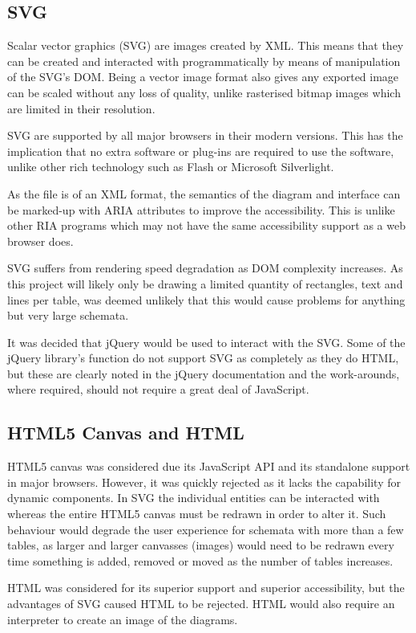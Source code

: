 \subsection{SVG}
Scalar vector graphics (SVG) are images created by XML. This means that they can be created and interacted with programmatically by means of manipulation of the SVG's DOM. Being a vector image format also gives any exported image can be scaled without any loss of quality, unlike rasterised bitmap images which are limited in their resolution.

SVG are supported by all major browsers in their modern versions. This has the implication that no extra software or plug-ins are required to use the software, unlike other rich technology such as Flash or Micro\-soft Silver\-light.

As the file is of an XML format, the semantics of the diagram and interface can be marked-up with ARIA attributes to improve the accessibility. This is unlike other RIA programs which may not have the same accessibility support as a web browser does.

SVG suffers from rendering speed degradation as DOM complexity increases. As this project will likely only be drawing a limited quantity of rectangles, text and lines per table, was deemed unlikely that this would cause problems for anything but very large schemata.

It was decided that jQuery would be used to interact with the SVG. Some of the jQuery library's function do not support SVG as completely as they do HTML, but these are clearly noted in the jQuery documentation and the work-arounds, where required, should not require a great deal of Java\-Script.

\subsection{HTML5 Canvas and HTML}
HTML5 canvas was considered due its Java\-Script API and its standalone support in major browsers. However, it was quickly rejected as it lacks the capability for dynamic components. In SVG the individual entities can be interacted with whereas the entire HTML5 canvas must be redrawn in order to alter it. Such behaviour would degrade the user experience for schemata with more than a few tables, as larger and larger canvasses (images) would need to be redrawn every time something is added, removed or moved as the number of tables increases.

HTML was considered for its superior support and superior accessibility, but the advantages of SVG caused HTML to be rejected. HTML would also require an interpreter to create an image of the diagrams.


